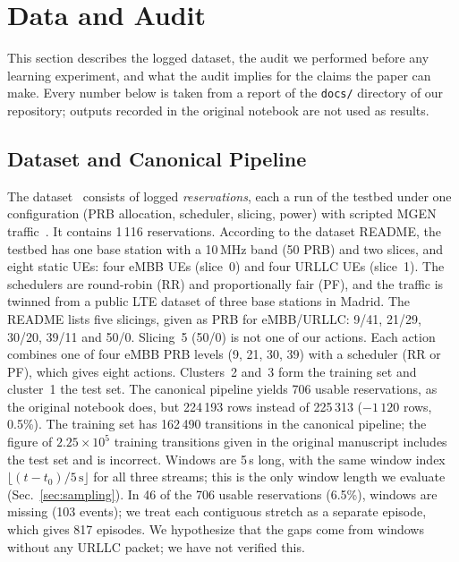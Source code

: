 \section{Data and Audit}
\label{sec:data_audit}
\label{sec:audit}

This section describes the logged dataset, the audit we performed before any learning experiment, and what the audit implies for the claims the paper can make.
Every number below is taken from a report of the \texttt{docs/} directory of our repository; outputs recorded in the original notebook are not used as results.%

\subsection{Dataset and Canonical Pipeline}
\label{sec:data_pipeline}

The dataset~\cite{TODO-dataset} consists of logged \emph{reservations}, each a run of the testbed under one configuration (PRB allocation, scheduler, slicing, power) with scripted MGEN traffic~\cite{TODO-mgen}.
It contains 1\,116 reservations.%
According to the dataset README, the testbed has one base station with a 10\,MHz band (50 PRB) and two slices, and eight static UEs: four eMBB UEs (slice~0) and four URLLC UEs (slice~1).%
The schedulers are round-robin (RR) and proportionally fair (PF), and the traffic is twinned from a public LTE dataset of three base stations in Madrid.%
The README lists five slicings, given as PRB for eMBB/URLLC: 9/41, 21/29, 30/20, 39/11 and 50/0.%
Slicing~5 (50/0) is not one of our actions.%
Each action combines one of four eMBB PRB levels (9, 21, 30, 39) with a scheduler (RR or PF), which gives eight actions.%
Clusters~2 and~3 form the training set and cluster~1 the test set.%
The canonical pipeline yields 706 usable reservations, as the original notebook does, but 224\,193 rows instead of 225\,313 ($-1\,120$ rows, 0.5\%).%
The training set has 162\,490 transitions in the canonical pipeline; the figure of $2.25\times10^{5}$ training transitions given in the original manuscript includes the test set and is incorrect.%
Windows are 5\,s long, with the same window index $\lfloor (t-t_0)/5\,\mathrm{s}\rfloor$ for all three streams; this is the only window length we evaluate (Sec.~\ref{sec:sampling}).%
In 46 of the 706 usable reservations (6.5\%), windows are missing (103 events); we treat each contiguous stretch as a separate episode, which gives 817 episodes.%
We hypothesize that the gaps come from windows without any URLLC packet; we have not verified this.%

